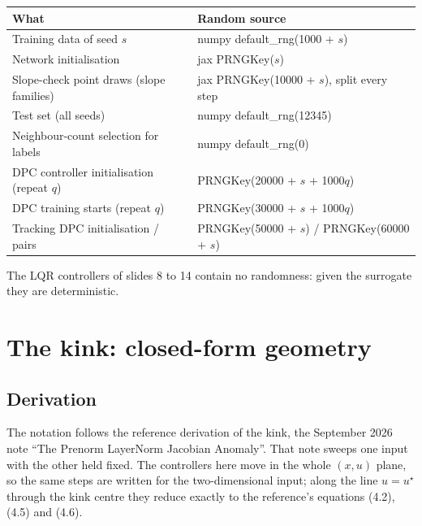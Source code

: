 \documentclass[11pt]{article}
\begin{document}
\begin{center}
\begin{tabular}{ll}
\toprule
What & Random source \\
\midrule
Training data of seed $s$ & numpy default\_rng(1000 + $s$) \\
Network initialisation & jax PRNGKey($s$) \\
Slope-check point draws (slope families) & jax PRNGKey(10000 + $s$), split every step \\
Test set (all seeds) & numpy default\_rng(12345) \\
Neighbour-count selection for labels & numpy default\_rng(0) \\
DPC controller initialisation (repeat $q$) & PRNGKey(20000 + $s$ + 1000$q$) \\
DPC training starts (repeat $q$) & PRNGKey(30000 + $s$ + 1000$q$) \\
Tracking DPC initialisation / pairs & PRNGKey(50000 + $s$) / PRNGKey(60000 + $s$) \\
\bottomrule
\end{tabular}
\end{center}
The LQR controllers of slides 8 to 14 contain no randomness: given the surrogate they are deterministic.

\section{The kink: closed-form geometry}\label{sec:kink}

\subsection{Derivation}
The notation follows the reference derivation of the kink, the September 2026 note ``The Prenorm LayerNorm Jacobian Anomaly''. That note sweeps one input with the other held fixed. The controllers here move in the whole $(x,u)$ plane, so the same steps are written for the two-dimensional input; along the line $u=u^\star$ through the kink centre they reduce exactly to the reference's equations (4.2), (4.5) and (4.6).
\end{document}

